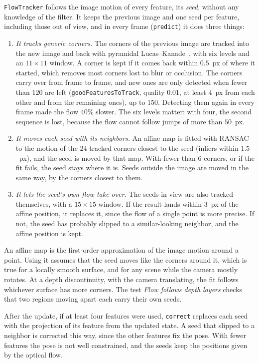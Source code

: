 \documentclass[11pt]{article}
\begin{document}
\texttt{FlowTracker} follows the image motion of every feature, its \emph{seed}, without any
knowledge of the filter. It keeps the previous image and one seed per feature, including those out
of view, and in every frame (\texttt{predict}) it does three things:
\begin{enumerate}
  \item \emph{It tracks generic corners.} The corners of the previous image are tracked into the
        new image and back with pyramidal Lucas--Kanade~\cite{lucas1981}, with six levels and an
        $11 \times 11$ window. A corner is kept if it comes back within $0.5$~px of where it
        started, which removes most corners lost to blur or occlusion. The corners carry over from
        frame to frame, and new ones are only detected when fewer than $120$ are left
        (\texttt{goodFeaturesToTrack}, quality $0.01$, at least $4$~px from each other and from the
        remaining ones), up to $150$. Detecting them again in every frame made the flow $40\%$
        slower. The six levels matter: with four, the second sequence is lost, because the flow
        cannot follow jumps of more than $50$~px.
  \item \emph{It moves each seed with its neighbors.} An affine map is fitted with RANSAC to the
        motion of the $24$ tracked corners closest to the seed (inliers within $1.5$~px), and the
        seed is moved by that map. With fewer than $6$ corners, or if the fit fails, the seed stays where
        it is. Seeds outside the image are moved in the same way, by the corners closest to them.
  \item \emph{It lets the seed's own flow take over.} The seeds in view are also tracked
        themselves, with a $15 \times 15$ window. If the result lands within $3$~px of the affine
        position, it replaces it, since the flow of a single point is more precise. If not, the
        seed has probably slipped to a similar-looking neighbor, and the affine position is kept.
\end{enumerate}
An affine map is the first-order approximation of the image motion around a point. Using it assumes
that the seed moves like the corners around it, which is true for a locally smooth surface, and for
any scene while the camera mostly rotates. At a depth discontinuity, with the camera translating,
the fit follows whichever surface has more corners. The test \emph{Flow follows depth layers}
checks that two regions moving apart each carry their own seeds.

After the update, if at least four features were used, \texttt{correct} replaces each seed with
the projection of its feature from the updated state. A seed that slipped to a neighbor is
corrected this way, since the other features fix the pose. With fewer features the pose is not
well constrained, and the seeds keep the positions given by the optical flow.
\end{document}
